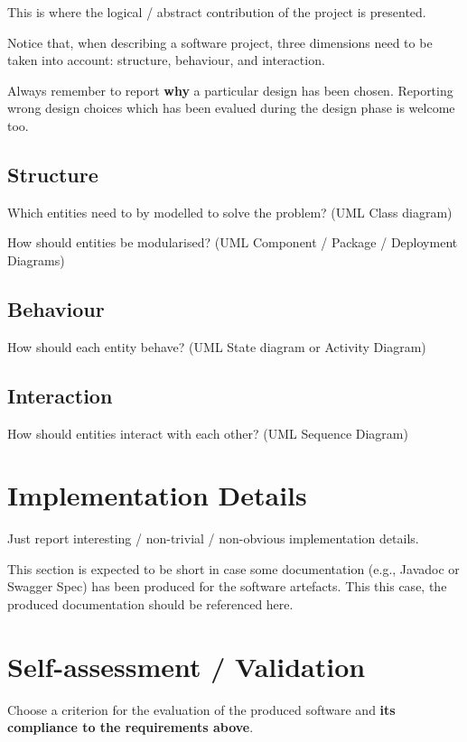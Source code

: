 This is where the logical / abstract contribution of the project is presented.

Notice that, when describing a software project, three dimensions need to be taken into account: structure, behaviour, and interaction.

Always remember to report \textbf{why} a particular design has been chosen.
Reporting wrong design choices which has been evalued during the design phase is welcome too.

\subsection{Structure}

Which entities need to by modelled to solve the problem?
%
(UML Class diagram)

How should entities be modularised?
%
(UML Component / Package / Deployment Diagrams)

\subsection{Behaviour}

How should each entity behave?
%
(UML State diagram or Activity Diagram)

\subsection{Interaction}

How should entities interact with each other?
%
(UML Sequence Diagram)

\section{Implementation Details}

Just report interesting / non-trivial / non-obvious implementation details.

This section is expected to be short in case some documentation (e.g., Javadoc or Swagger Spec) has been produced for the software artefacts.
%
This this case, the produced documentation should be referenced here.

\section{Self-assessment / Validation}

Choose a criterion for the evaluation of the produced software and \textbf{its compliance to the requirements above}.

